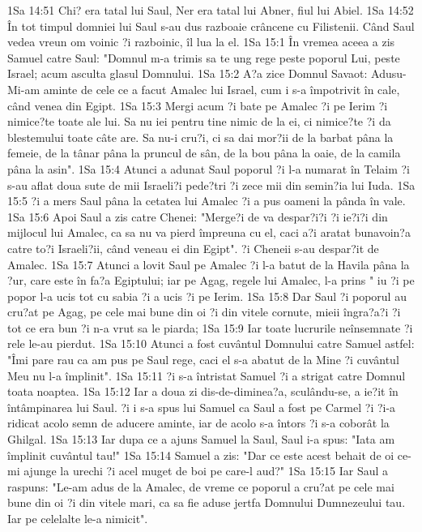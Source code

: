 1Sa 14:51  Chi? era tatal lui Saul, Ner era tatal lui Abner, fiul lui Abiel.
1Sa 14:52  În tot timpul domniei lui Saul s-au dus razboaie crâncene cu Filistenii. Când Saul vedea vreun om voinic ?i razboinic, îl lua la el.
1Sa 15:1  În vremea aceea a zis Samuel catre Saul: "Domnul m-a trimis sa te ung rege peste poporul Lui, peste Israel; acum asculta glasul Domnului.
1Sa 15:2  A?a zice Domnul Savaot: Adusu-Mi-am aminte de cele ce a facut Amalec lui Israel, cum i s-a împotrivit în cale, când venea din Egipt.
1Sa 15:3  Mergi acum ?i bate pe Amalec ?i pe Ierim ?i nimice?te toate ale lui. Sa nu iei pentru tine nimic de la ei, ci nimice?te ?i da blestemului toate câte are. Sa nu-i cru?i, ci sa dai mor?ii de la barbat pâna la femeie, de la tânar pâna la pruncul de sân, de la bou pâna la oaie, de la camila pâna la asin".
1Sa 15:4  Atunci a adunat Saul poporul ?i l-a numarat în Telaim ?i s-au aflat doua sute de mii Israeli?i pede?tri ?i zece mii din semin?ia lui Iuda.
1Sa 15:5  ?i a mers Saul pâna la cetatea lui Amalec ?i a pus oameni la pânda în vale.
1Sa 15:6  Apoi Saul a zis catre Chenei: "Merge?i de va despar?i?i ?i ie?i?i din mijlocul lui Amalec, ca sa nu va pierd împreuna cu el, caci a?i aratat bunavoin?a catre to?i Israeli?ii, când veneau ei din Egipt". ?i Cheneii s-au despar?it de Amalec.
1Sa 15:7  Atunci a lovit Saul pe Amalec ?i l-a batut de la Havila pâna la ?ur, care este în fa?a Egiptului; iar pe Agag, regele lui Amalec, l-a prins " iu ?i pe popor l-a ucis tot cu sabia ?i a ucis ?i pe Ierim.
1Sa 15:8  Dar Saul ?i poporul au cru?at pe Agag, pe cele mai bune din oi ?i din vitele cornute, mieii îngra?a?i ?i tot ce era bun ?i n-a vrut sa le piarda;
1Sa 15:9  Iar toate lucrurile neînsemnate ?i rele le-au pierdut.
1Sa 15:10  Atunci a fost cuvântul Domnului catre Samuel astfel: "Îmi pare rau ca am pus pe Saul rege, caci el s-a abatut de la Mine ?i cuvântul Meu nu l-a împlinit".
1Sa 15:11  ?i s-a întristat Samuel ?i a strigat catre Domnul toata noaptea.
1Sa 15:12  Iar a doua zi dis-de-diminea?a, sculându-se, a ie?it în întâmpinarea lui Saul. ?i i s-a spus lui Samuel ca Saul a fost pe Carmel ?i ?i-a ridicat acolo semn de aducere aminte, iar de acolo s-a întors ?i s-a coborât la Ghilgal.
1Sa 15:13  Iar dupa ce a ajuns Samuel la Saul, Saul i-a spus: "Iata am împlinit cuvântul tau!"
1Sa 15:14  Samuel a zis: "Dar ce este acest behait de oi ce-mi ajunge la urechi ?i acel muget de boi pe care-l aud?"
1Sa 15:15  Iar Saul a raspuns: "Le-am adus de la Amalec, de vreme ce poporul a cru?at pe cele mai bune din oi ?i din vitele mari, ca sa fie aduse jertfa Domnului Dumnezeului tau. Iar pe celelalte le-a nimicit".
